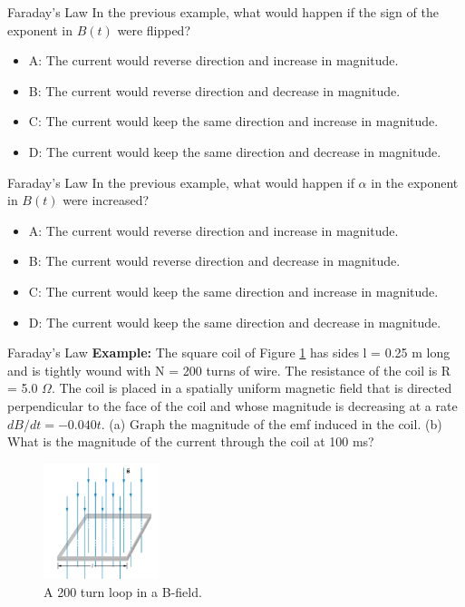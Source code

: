 \documentclass{beamer}
\begin{document}
\begin{frame}{Faraday's Law}
In the previous example, what would happen if the sign of the exponent in $B(t)$ were flipped?
\begin{itemize}
\item A: The current would reverse direction and increase in magnitude.
\item B: The current would reverse direction and decrease in magnitude.
\item C: The current would keep the same direction and increase in magnitude.
\item D: The current would keep the same direction and decrease in magnitude.
\end{itemize}
\end{frame}

\begin{frame}{Faraday's Law}
In the previous example, what would happen if $\alpha$ in the exponent in $B(t)$ were increased?
\begin{itemize}
\item A: The current would reverse direction and increase in magnitude.
\item B: The current would reverse direction and decrease in magnitude.
\item C: The current would keep the same direction and increase in magnitude.
\item D: The current would keep the same direction and decrease in magnitude.
\end{itemize}
\end{frame}

\begin{frame}{Faraday's Law}
\small
\textbf{Example:}
The square coil of Figure \ref{fig:loop2} has sides l = 0.25 m long and is tightly wound with N = 200 turns of wire. The resistance of the coil is R = 5.0 $\Omega$. The coil is placed in a spatially uniform magnetic field that is directed perpendicular to the face of the coil and whose magnitude is decreasing at a rate $dB/dt = −0.040 t$. (a) Graph the magnitude of the emf induced in the coil. (b) What is the magnitude of the current through the coil at 100 ms?
\begin{figure}
\centering
\includegraphics[width=0.3\textwidth]{figures/loop1.png}
\caption{\label{fig:loop2} A 200 turn loop in a B-field.}
\end{figure}
\end{frame}
\end{document}
